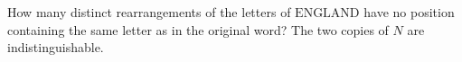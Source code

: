 How many distinct rearrangements of the letters of $\text{ENGLAND}$ have no position containing the same letter as in the original word? The two copies of $N$ are indistinguishable.
